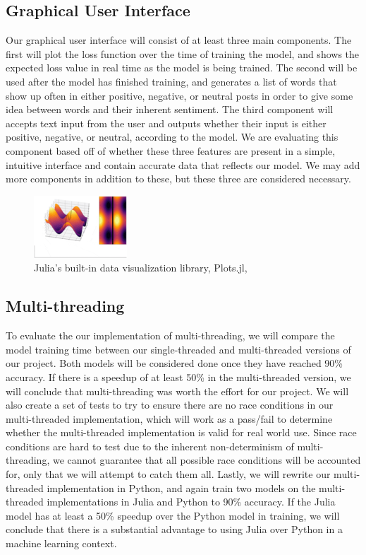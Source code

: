 \documentclass{article}
\begin{document}
\subsection{Graphical User Interface}
Our graphical user interface will consist of at least three main components. The first will plot the loss function over the time of training the model, and shows the expected loss value in real time as the model is being trained. The second will be used after the model has finished training, and generates a list of words that show up often in either positive, negative, or neutral posts in order to give some idea between words and their inherent sentiment. The third component will accepts text input from the user and outputs whether their input is either positive, negative, or neutral, according to the model. We are evaluating this component based off of whether these three features are present in a simple, intuitive interface and contain accurate data that reflects our model. We may add more components in addition to these, but these three are considered necessary.
\begin{figure}[h]
\caption{Julia's built-in data visualization library, Plots.jl, \protect\cite{Julia2020-2}}
\begin{center}
\includegraphics{waves}
\end{center}
\end{figure}

\subsection{Multi-threading}
To evaluate the our implementation of multi-threading, we will compare the model training time between our single-threaded and multi-threaded versions of our project. Both models will be considered done once they have reached 90\% accuracy. If there is a speedup of at least 50\% in the multi-threaded version, we will conclude that multi-threading was worth the effort for our project. We will also create a set of tests to try to ensure there are no race conditions in our multi-threaded implementation, which will work as a pass/fail to determine whether the multi-threaded implementation is valid for real world use. Since race conditions are hard to test due to the inherent non-determinism of multi-threading, we cannot guarantee that all possible race conditions will be accounted for, only that we will attempt to catch them all. Lastly, we will rewrite our multi-threaded implementation in Python, and again train two models on the multi-threaded implementations in Julia and Python to 90\% accuracy. If the Julia model has at least a 50\% speedup over the Python model in training, we will conclude that there is a substantial advantage to using Julia over Python in a machine learning context.
\end{document}
